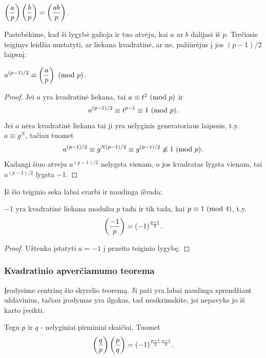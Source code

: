 \begin{teig} $\displaystyle \left(\frac{a}{p}\right)\left(\frac{b}{p}\right) = \left(\frac{ab}{p}\right).$ 
\end{teig}

Pastebėkime, kad ši lygybė galioja ir tuo atvėju, kai $a$ ar $b$ dalijasi
iš $p$. Trečiasis teiginys leidžia nustatyti, ar liekana kvadratinė, ar ne, pažiūrėjus
į jos $(p-1)/2$ laipsnį:

\begin{teig} $\displaystyle a^{(p-1)/2} \equiv \left(\frac{a}{p}\right) \ (\text{mod } p)$.
\end{teig}

\begin{proof} Jei $a$ yra kvadratinė liekana, tai $a\equiv t^2 \ (\text{mod } p)$ ir
  $$a^{(p-1)/2} \equiv t^{p-1} \equiv 1 \ (\text{mod } p).$$ Jei $a$ nėra
  kvadratinė liekana tai ji yra nelyginis generatoriaus laipsnis, t.y.
  $a\equiv g^N$, tačiau tuomet $$a^{(p-1)/2} \equiv g^{N(p-1)/2} \equiv g^{(p-1)/2}\not \equiv 1
  \ (\text{mod } p).$$ Kadangi šiuo atveju $a^{(p-1)/2}$ nelygsta vienam, o jos kvadratas
  lygsta vienam, tai $a^{(p-1)/2}$ lygsta $-1$.
\end{proof}

Iš šio teiginio seka labai svarbi ir naudinga išvada:

\begin{isv}
  $-1$ yra kvadratinė liekana moduliu $p$ tada ir tik tada, kai $p\equiv 1
  \ (\text{mod } 4)$, t.y. $$\left(\frac{-1}{p}\right)=(-1)^\frac{p-1}{2}.$$
\end{isv}

\begin{proof} Užtenka įstatyti $a=-1$ į praeito teiginio lygybę.
\end{proof}

\subsubsection{Kvadratinio apverčiamumo teorema}

Įrodysime centrinę šio skyrelio teoremą. Ji pati yra labai naudinga
sprendžiant uždavinius, tačiau įrodymas yra ilgokas, tad
nesikrimskite, jei nepavyks jo iš karto įveikti.

\begin{thm} 
  Tegu $p$ ir $q$ - nelyginiai pirminiai skaičiai. Tuomet
  $$\left(\frac{q}{p}\right)\left(\frac{p}{q}\right)=(-1)^{\frac{p-1}{2}\frac{q-1}{2}}.$$
\end{thm}

